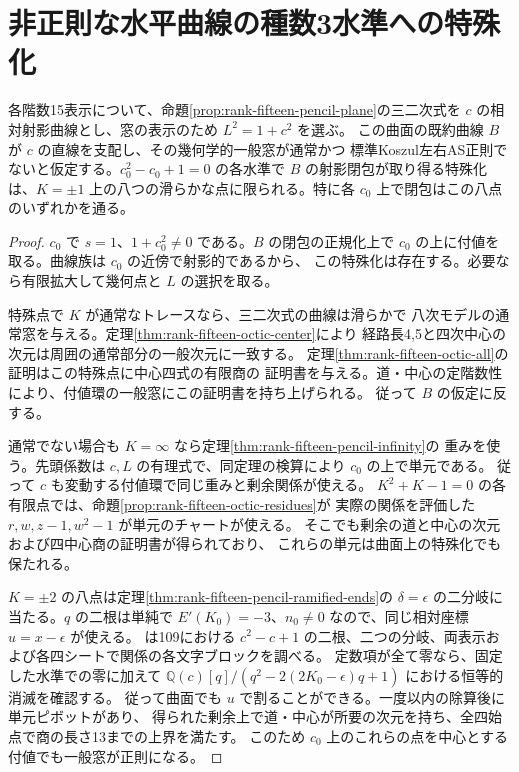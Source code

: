 \section{非正則な水平曲線の種数3水準への特殊化}
\label{sec:rank-fifteen-horizontal-specialization}
\begin{theorem}\label{thm:rank-fifteen-horizontal-specialization}
各階数15表示について、命題\ref{prop:rank-fifteen-pencil-plane}の三二次式を
$c$ の相対射影曲線とし、窓の表示のため $L^2=1+c^2$ を選ぶ。
この曲面の既約曲線 $B$ が $c$ の直線を支配し、その幾何学的一般窓が通常かつ
標準Koszul左右AS正則でないと仮定する。$c_0^2-c_0+1=0$ の各水準で
$B$ の射影閉包が取り得る特殊化は、$K=\pm1$ 上の八つの滑らかな点に限られる。特に各 $c_0$ 上で閉包はこの八点のいずれかを通る。
\end{theorem}
\begin{proof}
$c_0$ で $s=1$、$1+c_0^2\ne0$ である。$B$ の閉包の正規化上で
$c_0$ の上に付値を取る。曲線族は $c_0$ の近傍で射影的であるから、
この特殊化は存在する。必要なら有限拡大して幾何点と $L$ の選択を取る。

特殊点で $K$ が通常なトレースなら、三二次式の曲線は滑らかで
八次モデルの通常窓を与える。定理\ref{thm:rank-fifteen-octic-center}により
経路長4,5と四次中心の次元は周囲の通常部分の一般次元に一致する。
定理\ref{thm:rank-fifteen-octic-all}の証明はこの特殊点に中心四式の有限商の
証明書を与える。道・中心の定階数性により、付値環の一般窓にこの証明書を持ち上げられる。
従って $B$ の仮定に反する。

通常でない場合も $K=\infty$ なら定理\ref{thm:rank-fifteen-pencil-infinity}の
重みを使う。先頭係数は $c,L$ の有理式で、同定理の検算により $c_0$ の上で単元である。
従って $c$ も変動する付値環で同じ重みと剰余関係が使える。
$K^2+K-1=0$ の各有限点では、命題\ref{prop:rank-fifteen-octic-residues}が
実際の関係を評価した $r,w,z-1,w^2-1$ が単元のチャートが使える。
そこでも剰余の道と中心の次元および四中心商の証明書が得られており、
これらの単元は曲面上の特殊化でも保たれる。

$K=\pm2$ の八点は定理\ref{thm:rank-fifteen-pencil-ramified-ends}の
$\delta=\epsilon$ の二分岐に当たる。$q$ の二根は単純で
$E'(K_0)=-3$、$n_0\ne0$ なので、同じ相対座標 $u=x-\epsilon$ が使える。
 は109における
$c^2-c+1$ の二根、二つの分岐、両表示および各四シートで関係の各文字ブロックを調べる。
定数項が全て零なら、固定した水準での零に加えて
$\mathbb Q(c)[q]/(q^2-2(2K_0-\epsilon)q+1)$ における恒等的消滅を確認する。
従って曲面でも $u$ で割ることができる。一度以内の除算後に単元ピボットがあり、
得られた剰余上で道・中心が所要の次元を持ち、全四始点で商の長さ13までの上界を満たす。
このため $c_0$ 上のこれらの点を中心とする付値でも一般窓が正則になる。


\end{proof}
